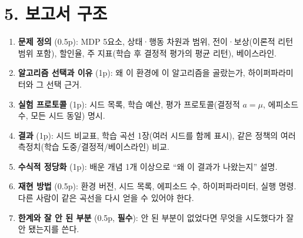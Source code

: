 \documentclass[12pt]{article}
\begin{document}
\section*{5. 보고서 구조}
\begin{enumerate}
\item \textbf{문제 정의} (0.5p): MDP 5요소, 상태·행동 차원과 범위,
  전이·보상(이론적 리턴 범위 포함), 할인율, 주 지표(학습 후 결정적
  평가의 평균 리턴), 베이스라인.
\item \textbf{알고리즘 선택과 이유} (1p): 왜 이 환경에 이 알고리즘을
  골랐는가, 하이퍼파라미터와 그 선택 근거.
\item \textbf{실험 프로토콜} (1p): 시드 목록, 학습 예산, 평가
  프로토콜(결정적 $a=\mu$, 에피소드 수, 모든 시드 동일) 명시.
\item \textbf{결과} (1p): 시드 비교표, 학습 곡선 1장(여러 시드를 함께
  표시), 같은 정책의 여러 측정치(학습 도중/결정적/베이스라인) 비교.
\item \textbf{수식적 정당화} (1p): 배운 개념 1개 이상으로 ``왜 이
  결과가 나왔는지'' 설명.
\item \textbf{재현 방법} (0.5p): 환경 버전, 시드 목록, 에피소드 수, 하이퍼파라미터, 실행 명령. 다른 사람이 같은 곡선을 다시 얻을 수 있어야 한다.
\item \textbf{한계와 잘 안 된 부분} (0.5p, \textbf{필수}): 안 된
  부분이 없었다면 무엇을 시도했다가 잘 안 됐는지를 쓴다.
\end{enumerate}
\end{document}
